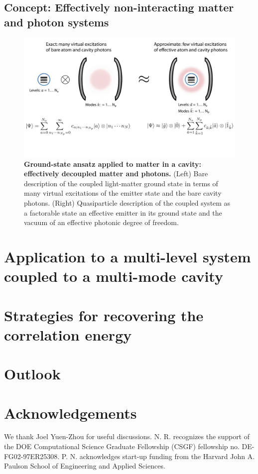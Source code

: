 \documentclass[aps,prb,twocolumn,
	groupedaddress,superscriptaddress,
	amsfonts,amssymb,amsmath,floatfix,
	citeautoscript]{revtex4-1}
\begin{document}
\subsection{Concept: Effectively non-interacting matter and photon systems}
\begin{figure}[t]
\includegraphics[width=18cm]{conceptfigure.pdf}
\caption{\textbf{Ground-state ansatz applied to matter in a cavity: effectively decoupled matter and photons.} (Left) Bare description of the coupled light-matter ground state in terms of many virtual excitations of the emitter state and the bare cavity photons. (Right) Quasiparticle description of the coupled system as a factorable state an effective emitter in its ground state and the vacuum of an effective photonic degree of freedom.}
\label{fig:ansatz}
\end{figure}

\section{Application to a multi-level system coupled to a multi-mode cavity}

\section{Strategies for recovering the correlation energy}

\section{Outlook}



\section{Acknowledgements}
We thank Joel Yuen-Zhou for useful discussions. N. R. recognizes the support of the DOE Computational Science Graduate Fellowship (CSGF) fellowship no.  DE-FG02-97ER25308. P. N. acknowledges start-up funding from the Harvard John A. Paulson School of Engineering and Applied Sciences. %



\end{document}
